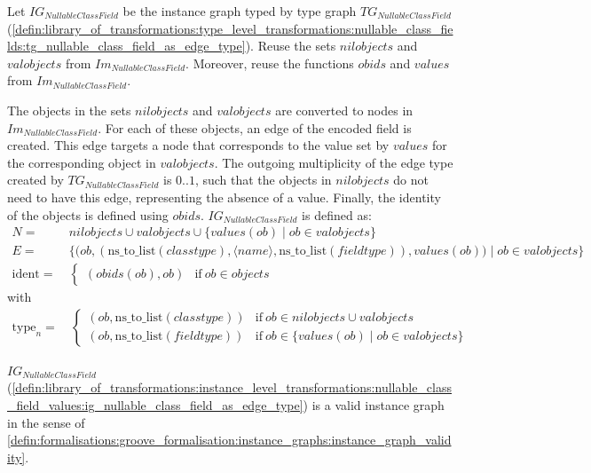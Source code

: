 \begin{defin}
\label{defin:library_of_transformations:instance_level_transformations:nullable_class_field_values:ig_nullable_class_field_as_edge_type}
Let $IG_{NullableClassField}$ be the instance graph typed by type graph $TG_{NullableClassField}$ (\cref{defin:library_of_transformations:type_level_transformations:nullable_class_fields:tg_nullable_class_field_as_edge_type}). Reuse the sets $nilobjects$ and $valobjects$ from $Im_{NullableClassField}$. Moreover, reuse the functions $obids$ and $values$ from $Im_{NullableClassField}$.

The objects in the sets $nilobjects$ and $valobjects$ are converted to nodes in $Im_{NullableClassField}$. For each of these objects, an edge of the encoded field is created. This edge targets a node that corresponds to the value set by $values$ for the corresponding object in $valobjects$. The outgoing multiplicity of the edge type created by $TG_{NullableClassField}$ is $0..1$, such that the objects in $nilobjects$ do not need to have this edge, representing the absence of a value. Finally, the identity of the objects is defined using $obids$. $IG_{NullableClassField}$ is defined as:
\begin{align*}
N =\ & nilobjects \cup valobjects \cup \{values(ob) \mid ob \in valobjects\} \\
E =\ & \big\{\big(ob, (\mathrm{ns\_\!to\_\!list}(classtype), \langle name \rangle, \mathrm{ns\_\!to\_\!list}(fieldtype)), values(ob)\big) \mid ob \in valobjects \big\} \\
\mathrm{ident} =\ & \begin{cases}
    (obids(ob), ob) & \mathrm{if }\ ob \in objects
\end{cases}
\end{align*}
with
\begin{align*}
\mathrm{type}_n =\ & \begin{cases}
    (ob, \mathrm{ns\_\!to\_\!list}(classtype)) & \mathrm{if }\ ob \in nilobjects \cup valobjects\\
    (ob, \mathrm{ns\_\!to\_\!list}(fieldtype)) & \mathrm{if }\ ob \in \{values(ob) \mid ob \in valobjects\}
\end{cases}
\end{align*}
\end{defin}

\begin{thm}
\label{defin:library_of_transformations:instance_level_transformations:nullable_class_field_values:ig_nullable_class_field_as_edge_type_correct}
$IG_{NullableClassField}$ (\cref{defin:library_of_transformations:instance_level_transformations:nullable_class_field_values:ig_nullable_class_field_as_edge_type}) is a valid instance graph in the sense of \cref{defin:formalisations:groove_formalisation:instance_graphs:instance_graph_validity}.
\end{thm}

